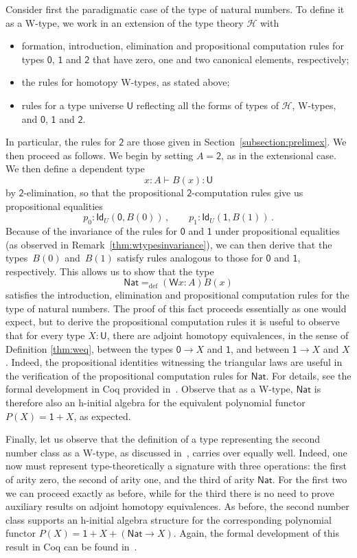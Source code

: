 \documentclass{article}
\newcommand{\defeq}{=_{\mathrm{def}}}
\newcommand{\nat}{\ensuremath{\mathsf{Nat}}}
\newcommand{\Id}{\mathsf{Id}}
\newcommand{\id}[1]{\Id_{#1}}
\newcommand{\W}{\mathsf{W}}
\newcommand{\UU}{\mathsf{U}}
\newcommand{\Hint}{\mathcal{H}}
\theoremstyle{remark}
\theoremstyle{definition}
\begin{document}
Consider first the paradigmatic case of the type of natural numbers. To define it as a W-type, we work in an extension of the type theory $\Hint$ with
\begin{itemize}
\item formation, introduction, elimination and propositional computation rules 
for types $\mathsf{0}$, $\mathsf{1}$ and $\mathsf{2}$ that have zero, one and two canonical elements,
respectively; 
\item the rules for homotopy W-types, as stated above;
\item rules for a type universe $\UU$ reflecting all the forms of types of $\Hint$, W-types, and
$\mathsf{0}$, $\mathsf{1}$ and $\mathsf{2}$.
\end{itemize}
In particular, the rules for $\mathsf{2}$ are those given in Section~\ref{subsection:prelimex}.
We then proceed as follows. We begin by setting $A =\mathsf{2}$, as in the extensional case.  
We then define a dependent type
\[
x : A \vdash B(x) : \UU
\]
by $\mathsf{2}$-elimination, so that the propositional $\mathsf{2}$-computation rules give us 
propositional equalities
\[
 p_0 : \id{U}( \mathsf{0}, B(0)) \, , \qquad
 p_1 : \id{U}( \mathsf{1}, B(1)) \, .
\]
Because of the invariance of the rules for $\mathsf{0}$ and $\mathsf{1}$ under propositional
equalities (as observed in Remark~\ref{thm:wtypesinvariance}), we can then derive that the types~$B(0)$ and~$B(1)$ satisfy rules analogous to those for $\mathsf{0}$ and $\mathsf{1}$, respectively. This allows us to show that the type 
\[
\nat \defeq (\W x : A) B(x)
\]
satisfies the introduction, elimination and propositional computation rules for the type of natural numbers. 
The proof of this fact proceeds essentially as one would expect, but to derive the propositional computation rules it
is useful to observe that for every type $X : \UU$, there are adjoint homotopy equivalences,
in the sense of Definition \ref{thm:weq}, between the types $\mathsf{0}  \rightarrow X$ and $\mathsf{1}$, 
and between $\mathsf{1} \rightarrow X$ and $X$. Indeed, the propositional identities witnessing 
the triangular laws are useful in the verification of the propositional computation rules for $\nat$. For 
details, see the formal development in Coq provided in~\cite{AwodeyS:indtht}.  Observe that as a W-type, $\nat$ is therefore also an h-initial algebra for the equivalent polynomial functor $P(X) = \mathsf{1}+ X$, as expected.

Finally, let us observe that the definition of a type representing the second number class as a W-type,
as discussed in~\cite{MartinLofP:inttt}, carries over equally well. Indeed, one
now must represent type-theoretically a signature with three operations: the first of arity zero, 
the second of arity one, and the third of arity $\nat$. For the first two we can proceed exactly as
before, while for the third there is no need to prove auxiliary results on adjoint homotopy 
equivalences. As before, the second number class supports an h-initial algebra structure for the corresponding polynomial functor $P(X) = \mathsf{1} + X + (\nat \rightarrow X)$.
Again, the formal development of this result in Coq can be found in~\cite{AwodeyS:indtht}.
\end{document}
